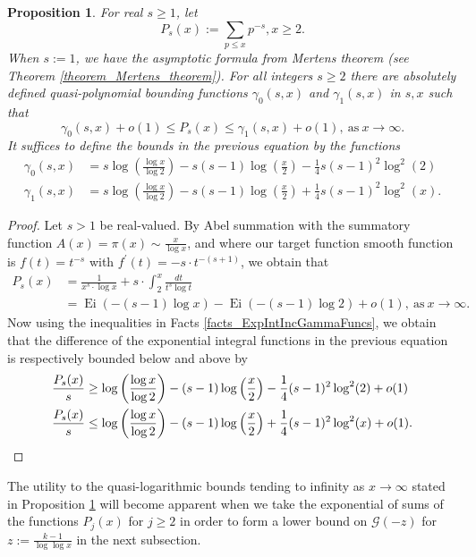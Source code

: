 \documentclass[11pt,reqno,a4letter]{article}
\numberwithin{figure}{section}
\numberwithin{table}{section}
\theoremstyle{plain}
\newtheorem{prop}[theorem]{Proposition}
\numberwithin{theorem}{section}
\theoremstyle{definition}
\newcommand{\NBRef}[1]{}
\begin{document}
\begin{prop} 
\label{cor_PartialSumsOfReciprocalsOfPrimePowers} 
For real $s \geq 1$, let 
\[
P_s(x) := \sum_{p \leq x} p^{-s}, x \geq 2. 
\]
When $s := 1$, we have the asymptotic formula from Mertens theorem 
(see Theorem \ref{theorem_Mertens_theorem}). 
For all integers $s \geq 2$ 
there are absolutely defined quasi-polynomial bounding functions 
$\gamma_0(s, x)$ and $\gamma_1(s, x)$ in $s,x$ such that 
\[
\gamma_0(s, x) + o(1) \leq P_s(x) \leq \gamma_1(s, x) + o(1), \mathrm{\ as\ } x \rightarrow \infty. 
\] 
It suffices to define the bounds in the previous equation by the functions 
\begin{align*} 
\gamma_0(s, x) & = s\log\left(\frac{\log x}{\log 2}\right) - 
     s(s-1) \log\left(\frac{x}{2}\right) - 
     \frac{1}{4} s(s-1)^2 \log^2(2) \\ 
\gamma_1(s, x) & = s\log\left(\frac{\log x}{\log 2}\right) - s(s-1) \log\left(\frac{x}{2}\right) + 
     \frac{1}{4} s(s-1)^2 \log^2(x). 
\end{align*}
\end{prop} 
\NBRef{A05-2020-04-26} 
\begin{proof} 
Let $s > 1$ be real-valued. 
By Abel summation with the summatory function 
$A(x) = \pi(x) \sim \frac{x}{\log x}$, and where 
our target function smooth function is $f(t) = t^{-s}$ with 
$f^{\prime}(t) = -s \cdot t^{-(s+1)}$, we obtain that 
\begin{align*} 
P_s(x) & = \frac{1}{x^s \cdot \log x} + s \cdot \int_2^{x} \frac{dt}{t^s \log t} \\ 
     & = \operatorname{Ei}(-(s-1) \log x) - \operatorname{Ei}(-(s-1) \log 2) + o(1), 
     \mathrm{\ as\ } x \rightarrow \infty. 
\end{align*} 
Now using the inequalities in Facts \ref{facts_ExpIntIncGammaFuncs}, we obtain that the 
difference of the exponential integral functions in the previous equation 
is respectively bounded below and above by 
\begin{align*} 
\frac{P_s(x)}{s} & \geq \log\left(\frac{\log x}{\log 2}\right) - (s-1) \log\left(\frac{x}{2}\right) - 
     \frac{1}{4} (s-1)^2 \log^2(2) + o(1) \\ 
\frac{P_s(x)}{s} & \leq \log\left(\frac{\log x}{\log 2}\right) - (s-1) \log\left(\frac{x}{2}\right) + 
     \frac{1}{4} (s-1)^2 \log^2(x) + o(1). 
     \qedhere 
\end{align*} 
\end{proof} 

The utility to the quasi-logarithmic bounds tending to 
infinity as $x \rightarrow \infty$ stated in 
Proposition \ref{cor_PartialSumsOfReciprocalsOfPrimePowers} 
will become apparent when we take the exponential of sums of the 
functions $P_j(x)$ for $j \geq 2$ in order to form a lower bound on 
$\mathcal{G}(-z)$ for $z := \frac{k-1}{\log\log x}$ in the 
next subsection. 
\end{document}
